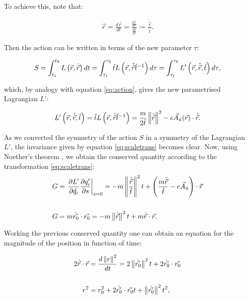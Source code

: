 To achieve this, note that:

\begin{align*}
\dot{\vec{r}} = \frac{d\vec{r}}{dt} = \frac{\frac{d\vec{r}}{d\tau}}{\frac{dt}{d\tau}} \coloneqq \frac{\mathring{\vec{r}}}{\mathring{t}}.
\end{align*}

Then the action can be written in terms of the new parameter $\tau$:

\begin{equation*}
S = \int_{t_1}^{t_2}L\left( \vec{r},\dot{\vec{r}} \right)dt = \int_{\tau_1}^{\tau_2}\mathring{t}L\left( \vec{r},\mathring{\vec{r}}{\mathring{t}}^{-1} \right)d\tau                                                                    = \int_{\tau_1}^{\tau_2}L'\left( \vec{r},\mathring{\vec{r}},\mathring{t} \right)d\tau,
\label{eq:actiontau}
\end{equation*}

which, by analogy with equation \eqref{eq:action}, gives the new parametrised Lagrangian $L'$:

\begin{equation*}
L'\left( \vec{r},\mathring{\vec{r}},\mathring{t} \right) = \mathring{t}L\left( \vec{r},\mathring{\vec{r}}{\mathring{t}}^{-1} \right) = \frac{m}{2\mathring{t}}\left\lVert \mathring{\vec{r}} \right\rVert^2 - e\vec{A}_{\hat{u}}(\vec{r})\cdot\mathring{\vec{r}}.
\end{equation*}

As we converted the symmetry of the action $S$ in a symmetry of the Lagrangian $L'$, the invariance given by  equation \eqref{eq:scaletrans} becomes clear. Now, using Noether's theorem \cite{scheck}, we obtain the conserved quantity according to the transformation \eqref{eq:scaletrans}: \\

\begin{align*}
G &= \left. \frac{\partial L'}{\partial \mathring{q_i}} \frac{\partial q'_i}{\partial s} \right|_{s=0} = -m\left\lVert \frac{\mathring{\vec{r}}}{\mathring{t}} \right\rVert^2t + \left( \frac{m\mathring{\vec{r}}}{\mathring{t}} - e\vec{A}_{\hat{u}} \right)\cdot \vec{r}\\
\\
G &= m\dot{\vec{r_0}}\cdot\vec{r_0} = -m\left\lVert \dot{\vec{r}} \right\rVert^2t + m\dot{\vec{r}}\cdot\vec{r} .
\end{align*}

Working the previous conserved quantity one can obtain an equation for the magnitude of the position in function of time:

\begin{align*}
\nonumber
 2\dot{\vec{r}}\cdot\vec{r} &= \frac{d\left\lVert r \right\rVert^2}{dt} = 2\left\lVert \dot{\vec{r_0}} \right\rVert^2t + 2\dot{\vec{r_0}}\cdot\vec{r_0}\\
 \\ 
 r^2 &= r_0^2 +2\dot{\vec{r_0}}\cdot\vec{r_0}t +\left\lVert \dot{\vec{r_0}} \right\rVert^2t^2 ,
\end{align*}


